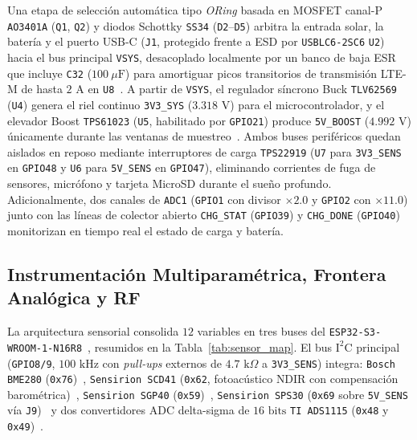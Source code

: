 \documentclass[conference]{IEEEtran}
\begin{document}
Una etapa de selección automática tipo \emph{ORing} basada en MOSFET canal-P \texttt{AO3401A} (\texttt{Q1}, \texttt{Q2}) y diodos Schottky \texttt{SS34} (\texttt{D2}--\texttt{D5}) arbitra la entrada solar, la batería y el puerto USB-C (\texttt{J1}, protegido frente a ESD por \texttt{USBLC6-2SC6} \texttt{U2}) hacia el bus principal \texttt{VSYS}, desacoplado localmente por un banco de baja ESR que incluye \texttt{C32} ($100\ \mu\text{F}$) para amortiguar picos transitorios de transmisión LTE-M de hasta $2\text{ A}$ en \texttt{U8}~\cite{simcom2021sim7080g}. A partir de \texttt{VSYS}, el regulador síncrono Buck \texttt{TLV62569} (\texttt{U4}) genera el riel continuo \texttt{3V3\_SYS} ($3.318\text{ V}$) para el microcontrolador, y el elevador Boost \texttt{TPS61023} (\texttt{U5}, habilitado por \texttt{GPIO21}) produce \texttt{5V\_BOOST} ($4.992\text{ V}$) únicamente durante las ventanas de muestreo~\cite{ti2020power}. Ambos buses periféricos quedan aislados en reposo mediante interruptores de carga \texttt{TPS22919} (\texttt{U7} para \texttt{3V3\_SENS} en \texttt{GPIO48} y \texttt{U6} para \texttt{5V\_SENS} en \texttt{GPIO47}), eliminando corrientes de fuga de sensores, micrófono y tarjeta MicroSD durante el sueño profundo. Adicionalmente, dos canales de \texttt{ADC1} (\texttt{GPIO1} con divisor $\times 2.0$ y \texttt{GPIO2} con $\times 11.0$) junto con las líneas de colector abierto \texttt{CHG\_STAT} (\texttt{GPIO39}) y \texttt{CHG\_DONE} (\texttt{GPIO40}) monitorizan en tiempo real el estado de carga y batería.

\subsection{Instrumentación Multiparamétrica, Frontera Analógica y RF}

La arquitectura sensorial consolida $12$ variables en tres buses del \texttt{ESP32-S3-WROOM-1-N16R8}~\cite{espressif2024esp32s3}, resumidos en la Tabla~\ref{tab:sensor_map}. El bus $\text{I}^2\text{C}$ principal (\texttt{GPIO8/9}, $100\text{ kHz}$ con \emph{pull-ups} externos de $4.7\text{ k}\Omega$ a \texttt{3V3\_SENS}) integra: \texttt{Bosch BME280} (\texttt{0x76})~\cite{bosch2022bme280}, \texttt{Sensirion SCD41} (\texttt{0x62}, fotoacústico NDIR con compensación barométrica)~\cite{sensirion2021scd41}, \texttt{Sensirion SGP40} (\texttt{0x59})~\cite{sensirion2020sgp40}, \texttt{Sensirion SPS30} (\texttt{0x69} sobre \texttt{5V\_SENS} vía \texttt{J9})~\cite{sensirion2020sps30} y dos convertidores ADC delta-sigma de $16\text{ bits}$ \texttt{TI ADS1115} (\texttt{0x48} y \texttt{0x49})~\cite{ti2018ads1115}.
\end{document}
